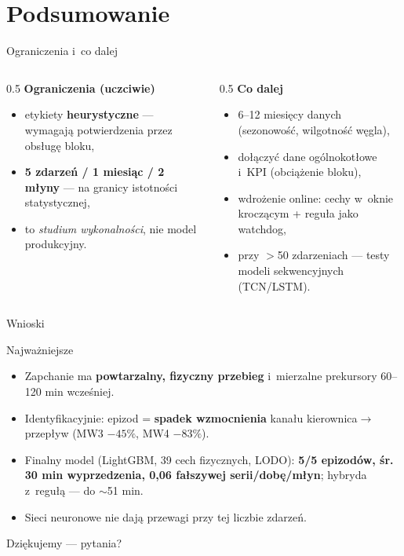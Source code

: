 \documentclass[aspectratio=169,11pt]{beamer}
\newcommand{\sig}[1]{\textcolor{akcent}{\textbf{#1}}}
\begin{document}
\section{Podsumowanie}

\begin{frame}{Ograniczenia i~co dalej}
  \begin{columns}[T]
    \begin{column}{0.5\textwidth}
      \textbf{Ograniczenia (uczciwie)}
      \begin{itemize}\footnotesize
        \item etykiety \sig{heurystyczne} --- wymagają potwierdzenia przez obsługę bloku,
        \item \sig{5 zdarzeń / 1 miesiąc / 2 młyny} --- na granicy istotności statystycznej,
        \item to \emph{studium wykonalności}, nie model produkcyjny.
      \end{itemize}
    \end{column}
    \begin{column}{0.5\textwidth}
      \textbf{Co dalej}
      \begin{itemize}\footnotesize
        \item 6--12 miesięcy danych (sezonowość, wilgotność węgla),
        \item dołączyć dane ogólnokotłowe i~KPI (obciążenie bloku),
        \item wdrożenie online: cechy w~oknie kroczącym + reguła jako watchdog,
        \item przy $>$50 zdarzeniach --- testy modeli sekwencyjnych (TCN/LSTM).
      \end{itemize}
    \end{column}
  \end{columns}
\end{frame}

\begin{frame}{Wnioski}
  \begin{block}{Najważniejsze}
    \begin{itemize}\footnotesize
      \item Zapchanie ma \sig{powtarzalny, fizyczny przebieg} i~mierzalne prekursory 60--120 min wcześniej.
      \item Identyfikacyjnie: epizod = \sig{spadek wzmocnienia} kanału kierownica$\to$przepływ (MW3 $-45\%$, MW4 $-83\%$).
      \item Finalny model (LightGBM, 39 cech fizycznych, LODO): \sig{5/5 epizodów, śr. 30 min wyprzedzenia, 0,06 fałszywej serii/dobę/młyn}; hybryda z~regułą --- do $\sim$51 min.
      \item Sieci neuronowe nie dają przewagi przy tej liczbie zdarzeń.
    \end{itemize}
  \end{block}
  \vspace{0.5em}
  \centering \large \textcolor{akcent}{Dziękujemy --- pytania?}
\end{frame}
\end{document}
